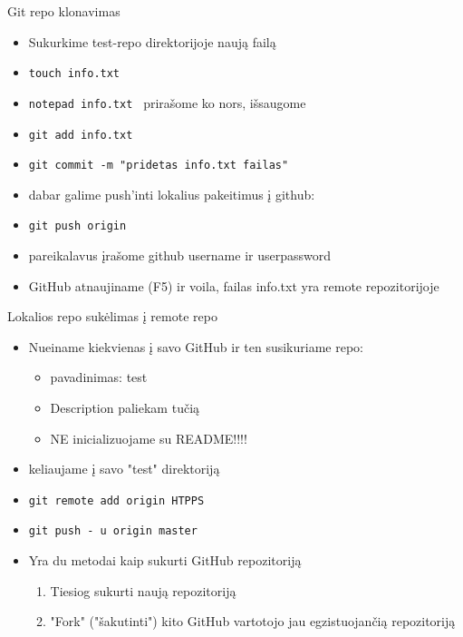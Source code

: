 \documentclass[11pt,xcolor=table]{beamer}
\begin{document}

\begin{frame}{Git repo klonavimas}
\begin{itemize}
\item Sukurkime test-repo direktorijoje naują failą
\item \colorbox{listinggray}{\lstinline|touch info.txt|}
\item \colorbox{listinggray}{\lstinline|notepad info.txt |} prirašome ko nors, išsaugome
\item \colorbox{listinggray}{\lstinline|git add info.txt|}
\item \colorbox{listinggray}{\lstinline|git commit -m "pridetas info.txt failas"|}
\item dabar galime push'inti lokalius pakeitimus į github:
\item \colorbox{listinggray}{\lstinline|git push origin |}
\item pareikalavus įrašome github username ir userpassword
\item GitHub atnaujiname (F5) ir voila, failas info.txt yra remote repozitorijoje
\end{itemize}
\end{frame}


\begin{frame}{Lokalios repo sukėlimas į remote repo}
\begin{itemize}
\item Nueiname kiekvienas į savo GitHub ir ten susikuriame repo:
\begin{itemize}
\item pavadinimas: test
\item Description paliekam tučią
\item NE inicializuojame su README!!!!
\end{itemize}
\item keliaujame į savo "test" direktoriją
\item \colorbox{listinggray}{\lstinline|git remote add origin HTPPS|}
\item \colorbox{listinggray}{\lstinline|git push - u origin master|}
\end{itemize}
\end{frame}


\begin{frame}
\begin{itemize}
\item Yra du metodai kaip sukurti GitHub repozitoriją
\begin{enumerate}
\item Tiesiog sukurti naują repozitoriją
\item "Fork" ("šakutinti") kito GitHub vartotojo jau egzistuojančią repozitoriją
\end{enumerate}
\end{itemize}
\end{frame}
\end{document}
